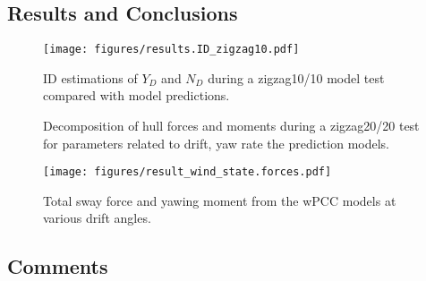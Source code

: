 \subsection*{Results and Conclusions}

\begin{figure}[h]
    \centering
    \texttt{[image: figures/results.ID\_zigzag10.pdf]}
    \caption{ID estimations of $Y_D$ and $N_D$ during a zigzag10/10 model test compared with model predictions.}
    \label{fig:ID_zigzag10}
\end{figure}

\begin{figure}[h]
    \begin{center}
        
        \caption{Decomposition of hull forces and moments during a zigzag20/20 test for parameters related to drift, yaw rate the prediction models.}
        \label{fig:ID_regression_N_decomposition}
    \end{center}
\end{figure}

\begin{figure}[h!]
    \texttt{[image: figures/result\_wind\_state.forces.pdf]}
    \caption{Total sway force and yawing moment from the wPCC models at various drift angles.}
    \label{fig:result_wind_state}
\end{figure}

\subsection*{Comments}
\clearpage